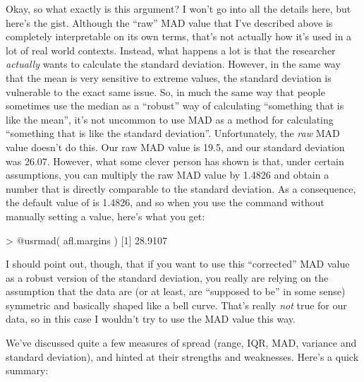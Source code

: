 Okay, so what exactly is this  argument? I won't go into all the details here, but here's the gist. Although the ``raw'' MAD value that I've described above is completely interpretable on its own terms, that's not actually how it's used in a lot of real world contexts. Instead, what happens a lot is that the researcher {\it actually} wants to calculate the standard deviation. However, in the same way that the mean is very sensitive to extreme values, the standard deviation is vulnerable to the exact same issue. So, in much the same way that people sometimes use the median as a ``robust'' way of calculating ``something that is like the mean'', it's not uncommon to use MAD as a method for calculating ``something that is like the standard deviation''. Unfortunately, the {\it raw} MAD value doesn't do this. Our raw MAD value is 19.5, and our standard deviation was 26.07. However, what some clever person has shown is that, under certain assumptions, you can multiply the raw MAD value by 1.4826 and obtain a number that is directly comparable to the standard deviation. As a consequence, the default value of  is 1.4826, and so when you use the  command without manually setting a value, here's what you get:
\begin{rblock1}
> @usr{mad( afl.margins )}
[1] 28.9107
\end{rblock1}
I should point out, though, that if you want to use this ``corrected'' MAD value as a robust version of the standard deviation, you really are relying on the assumption that the data are (or at least, are ``supposed to be'' in some sense) symmetric and basically shaped like a bell curve. That's really {\it not} true for our  data, so in this case I wouldn't try to use the MAD value this way.



We've discussed quite a few measures of spread (range, IQR, MAD, variance and standard deviation), and hinted at their strengths and weaknesses. Here's a quick summary:


